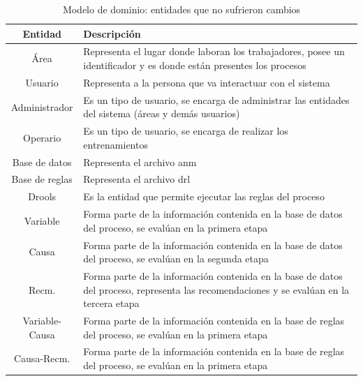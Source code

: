 \begin{table}[h]
\begin{center}
\begin{tabular}{ | c | p{10cm} | }
\hline
\textbf{Entidad} & \textbf{Descripción} \\
\hline
Área & Representa el lugar donde laboran los trabajadores, posee un identificador y es donde están presentes los procesos \\
\hline
Usuario & Representa a la persona que va interactuar con el sistema \\
\hline
Administrador & Es un tipo de usuario, se encarga de administrar las entidades del sistema (áreas y demás usuarios) \\
\hline
Operario & Es un tipo de usuario, se encarga de realizar los entrenamientos \\
\hline
Base de datos & Representa el archivo \textsf{anm} \\
\hline
Base de reglas & Representa el archivo \textsf{drl} \\
\hline
Drools & Es la entidad que permite ejecutar las reglas del proceso \\
\hline
Variable & Forma parte de la información contenida en la base de datos del proceso, se evalúan en la primera etapa \\
\hline
Causa & Forma parte de la información contenida en la base de datos del proceso, se evalúan en la segunda etapa \\
\hline
Recm. & Forma parte de la información contenida en la base de datos del proceso, representa las recomendaciones y se evalúan en la tercera etapa \\
\hline
Variable-Causa & Forma parte de la información contenida en la base de reglas del proceso, se evalúan en la primera etapa \\
\hline
Causa-Recm. & Forma parte de la información contenida en la base de reglas del proceso, se evalúan en la primera etapa \\
\hline
\end{tabular}
\caption{Modelo de dominio: entidades que no sufrieron cambios}
\label{tab:ent-azul}
\end{center}
\end{table}

